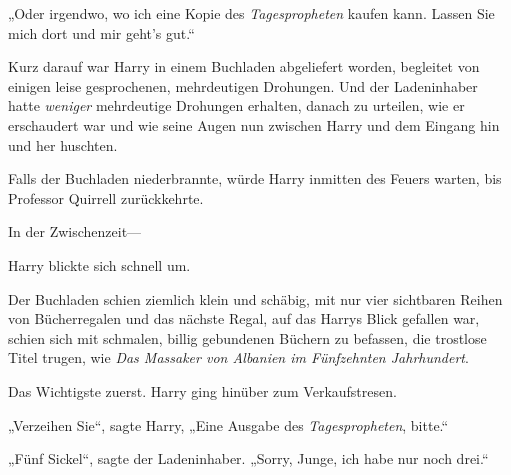 „Oder irgendwo, wo ich eine Kopie des \emph{Tagespropheten} kaufen kann. Lassen Sie mich dort und mir geht’s gut.“

Kurz darauf war Harry in einem Buchladen abgeliefert worden, begleitet von einigen leise gesprochenen, mehrdeutigen Drohungen. Und der Ladeninhaber hatte \emph{weniger} mehrdeutige Drohungen erhalten, danach zu urteilen, wie er erschaudert war und wie seine Augen nun zwischen Harry und dem Eingang hin und her huschten.

Falls der Buchladen niederbrannte, würde Harry inmitten des Feuers warten, bis Professor Quirrell zurückkehrte.

In der Zwischenzeit—

Harry blickte sich schnell um.

Der Buchladen schien ziemlich klein und schäbig, mit nur vier sichtbaren Reihen von Bücherregalen und das nächste Regal, auf das Harrys Blick gefallen war, schien sich mit schmalen, billig gebundenen Büchern zu befassen, die trostlose Titel trugen, wie \emph{Das Massaker von Albanien im Fünfzehnten Jahrhundert}.%

Das Wichtigste zuerst. Harry ging hinüber zum Verkaufstresen.

„Verzeihen Sie“, sagte Harry, „Eine Ausgabe des \emph{Tagespropheten}, bitte.“

„Fünf Sickel“, sagte der Ladeninhaber. „Sorry, Junge, ich habe nur noch drei.“

